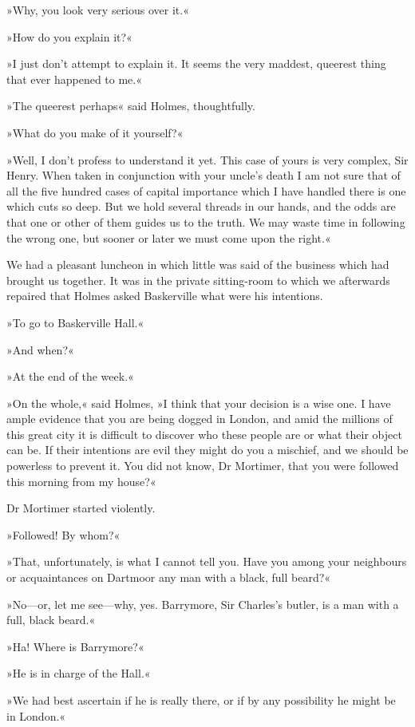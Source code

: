 »Why, you look very serious over it.«

»How do you explain it?«

»I just don't attempt to explain it. It seems the very maddest, queerest thing that ever happened to me.«

»The queerest perhaps\longdash« said Holmes, thoughtfully.

»What do you make of it yourself?«

»Well, I don't profess to understand it yet. This case of yours is very complex, Sir Henry. When taken in conjunction with your uncle's death I am not sure that of all the five hundred cases of capital importance which I have handled there is one which cuts so deep. But we hold several threads in our hands, and the odds are that one or other of them guides us to the truth. We may waste time in following the wrong one, but sooner or later we must come upon the right.«

We had a pleasant luncheon in which little was said of the business which had brought us together. It was in the private sitting-room to which we afterwards repaired that Holmes asked Baskerville what were his intentions.

»To go to Baskerville Hall.«

»And when?«

»At the end of the week.«

»On the whole,« said Holmes, »I think that your decision is a wise one. I have ample evidence that you are being dogged in London, and amid the millions of this great city it is difficult to discover who these people are or what their object can be. If their intentions are evil they might do you a mischief, and we should be powerless to prevent it. You did not know, Dr Mortimer, that you were followed this morning from my house?«

Dr Mortimer started violently.

»Followed! By whom?«

»That, unfortunately, is what I cannot tell you. Have you among your neighbours or acquaintances on Dartmoor any man with a black, full beard?«

»No\allowbreak---\allowbreak or, let me see\allowbreak---\allowbreak why, yes. Barrymore, Sir Charles's butler, is a man with a full, black beard.«

»Ha! Where is Barrymore?«

»He is in charge of the Hall.«

»We had best ascertain if he is really there, or if by any possibility he might be in London.«

